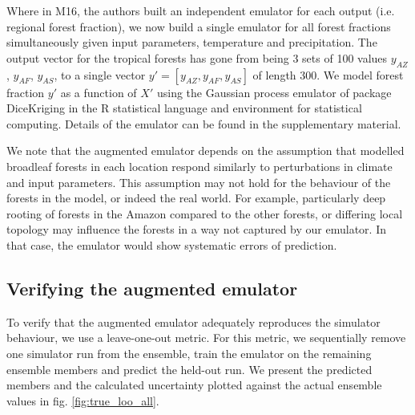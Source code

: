 \documentclass[gmd, manuscript]{copernicus}
\begin{document}
Where in M16, the authors built an independent emulator for each output (i.e. regional forest fraction), we now build a single emulator for all forest fractions simultaneously given input parameters, temperature and precipitation. The output vector for the tropical forests has gone from being 3 sets of 100 values $y_{AZ}$, $y_{AF}$, $y_{AS}$, to a single vector $y' = [y_{AZ}, y_{AF}, y_{AS}]$ of length 300. We model forest fraction $y'$ as a function of $X'$ using the Gaussian process emulator of package DiceKriging \citep{roustant2012dicekriging} in the R statistical language and environment for statistical computing. Details of the emulator can be found in the supplementary material.

We note that the augmented emulator depends on the assumption that modelled broadleaf forests in each location respond similarly to perturbations in climate and input parameters. This assumption may not hold for the behaviour of the forests in the model, or indeed the real world. For example, particularly deep rooting of forests in the Amazon compared to the other forests, or differing local topology may influence the forests in a way not captured by our emulator. In that case, the emulator would show systematic errors of prediction. 

\subsection{Verifying the augmented emulator}\label{ssec:verifying}
To verify that the augmented emulator adequately reproduces the simulator behaviour, we use a leave-one-out metric. For this metric, we sequentially remove one simulator run from the ensemble, train the emulator on the remaining ensemble members and predict the held-out run. We present the predicted members and the calculated uncertainty plotted against the actual ensemble values in fig. \ref{fig:true_loo_all}.
\end{document}
